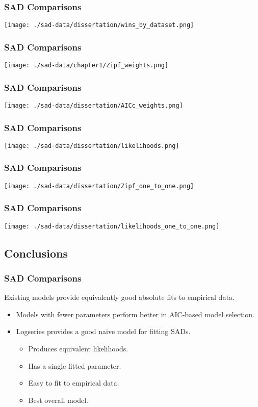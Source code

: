 \documentclass[14pt]{beamer}
\begin{document}
\begin{frame}{}
\frametitle{SAD Comparisons}
\texttt{[image: ./sad-data/dissertation/wins\_by\_dataset.png]}
\end{frame}

\begin{frame}{}
\frametitle{SAD Comparisons}
\texttt{[image: ./sad-data/chapter1/Zipf\_weights.png]}
\end{frame}


\begin{frame}{}
\frametitle{SAD Comparisons}
\texttt{[image: ./sad-data/dissertation/AICc\_weights.png]}
\end{frame}

\begin{frame}{}
\frametitle{SAD Comparisons}
\texttt{[image: ./sad-data/dissertation/likelihoods.png]}
\end{frame}

\begin{frame}{}
\frametitle{SAD Comparisons}
\texttt{[image: ./sad-data/dissertation/Zipf\_one\_to\_one.png]}
\end{frame}

\begin{frame}{}
\frametitle{SAD Comparisons}
\texttt{[image: ./sad-data/dissertation/likelihoods\_one\_to\_one.png]}
\end{frame}

\subsection{Conclusions}
\begin{frame}
\frametitle{SAD Comparisons}
Existing models provide equivalently good absolute fits to empirical data.
\begin{itemize}
\item Models with fewer parameters perform better in AIC-based model selection.\\
\item Logseries provides a good naive model for fitting SADs.\\
\begin{itemize}
\item Produces equivalent likelihoods.
\item Has a single fitted parameter.
\item Easy to fit to empirical data.
\item Best overall model.
\end{itemize}
\end{itemize}
\end{frame}
\end{document}

